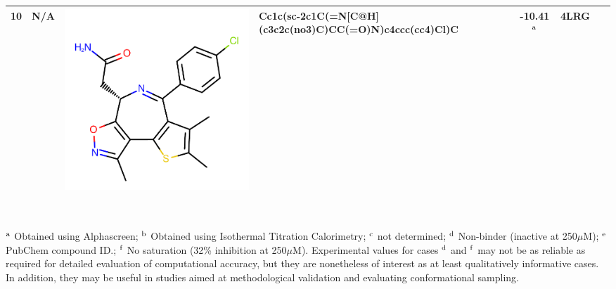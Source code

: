 \documentclass[aps,pre,twocolumn,nofootinbib,superscriptaddress,10pt, final,tightenlines]{revtex4-1}
\begin{document}
\begin{table}
\begin{center}
\begin{tabular}{llp{2cm}>{\ttfamily}lS[table-format=-1.2, table-figures-uncertainty=1]ll}
10       & N/A                                    & \parbox[c]{1em}{\includegraphics[scale=0.15]{figures/new-bromo/C-3.pdf}}      & Cc1c(sc-2c1C(=N[C@H](c3c2c(no3)C)CC(=O)N)c4ccc(cc4)Cl)C          & -10.41$^{\rm a}$                              & 4LRG~\cite{Gehling:2013:ACSMed.Chem.Lett.} & \cite{Gehling:2013:ACSMed.Chem.Lett.}   \\ 
\bottomrule
\end{tabular}                                                                                                                                                                                                                                                                                                       \\
\end{center}
$^{\rm a}$ Obtained using Alphascreen; $^{\rm b}$ Obtained using Isothermal Titration Calorimetry; $^{\rm c}$ not determined; $^{\rm d}$ Non-binder (inactive at 250$\mu$M); $^{\rm e}$ PubChem compound ID.; $^{\rm f}$ No saturation (32\% inhibition at 250$\mu$M). 
Experimental values for cases $^{\rm d}$ and $^{\rm f}$ may not be as reliable as required for detailed evaluation of computational accuracy, but they are nonetheless of interest as at least qualitatively informative cases. In addition, they may be useful in studies aimed at methodological validation and evaluating conformational sampling. 
\end{table}
\endgroup
\end{document}
